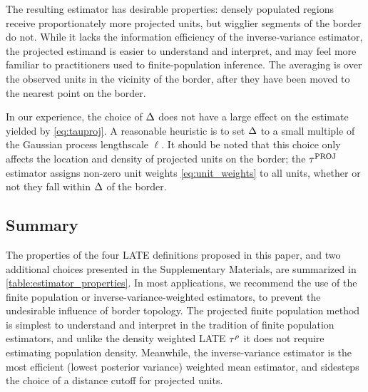 The resulting estimator has desirable properties: densely populated regions receive proportionately more projected units, but wigglier segments of the border do not.
While it lacks the information efficiency of the inverse-variance estimator,
the projected estimand is easier to understand and interpret,
and may feel more familiar to practitioners used to finite-population inference.
The averaging is over the observed units in the vicinity of the border, after they have been moved to the nearest point on the border.

In our experience, the choice of \(\Delta\) does not have a large effect on the estimate yielded by \autoref{eq:tauproj}.
A reasonable heuristic is to set \(\Delta\) to a small multiple of the Gaussian process lengthscale \(\ell\).
It should be noted that this choice only affects the location and density of projected units on the border; the \(\tau^{\mathrm{PROJ}}\) estimator assigns non-zero unit weights \autoref{eq:unit_weights} to all units, whether or not they fall within \(\Delta\) of the border.

\subsection{Summary}
\label{sec:summary}

The properties of the four LATE definitions proposed in this paper, and two additional choices presented in the Supplementary Materials, are summarized in \autoref{table:estimator_properties}.
In most applications, we recommend the use of the finite population or inverse-variance-weighted estimators, to prevent the undesirable influence of border topology.
The projected finite population method is simplest to understand and interpret in the tradition of finite population estimators, and unlike the density weighted LATE \(\tau^{\rho}\) it does not require estimating population density.
Meanwhile, the inverse-variance estimator is the most efficient (lowest posterior variance) weighted mean estimator,
and sidesteps the choice of a distance cutoff for projected units.


